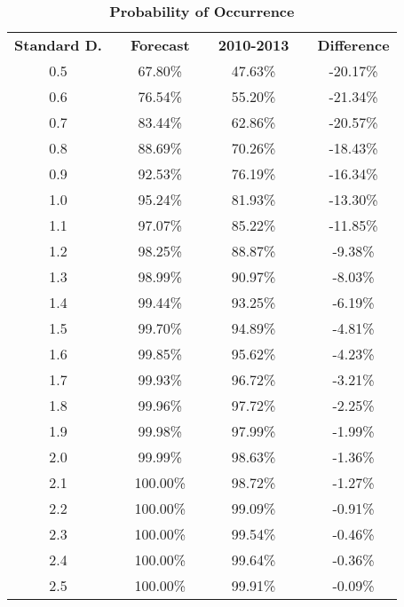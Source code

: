 \documentclass[12pt,halfline,a4paper]{ouparticle}
\begin{document}
\begin{table}[h]
	\centering
	\caption{\textbf{Probability of Occurrence}}
	\begin{tabular}{ccccccc}
		\toprule
		\toprule
		\textbf{Standard D.} &       & \textbf{Forecast} &       & \textbf{2010-2013} &       & \textbf{Difference} \\
		\cmidrule{1-1}\cmidrule{3-3}\cmidrule{5-5}\cmidrule{7-7}
		0.5   &       & 67.80\% &       & 47.63\% &       & -20.17\% \\
		0.6   &       & 76.54\% &       & 55.20\% &       & -21.34\% \\
		0.7   &       & 83.44\% &       & 62.86\% &       & -20.57\% \\
		0.8   &       & 88.69\% &       & 70.26\% &       & -18.43\% \\
		0.9   &       & 92.53\% &       & 76.19\% &       & -16.34\% \\
		1.0   &       & 95.24\% &       & 81.93\% &       & -13.30\% \\
		1.1   &       & 97.07\% &       & 85.22\% &       & -11.85\% \\
		1.2   &       & 98.25\% &       & 88.87\% &       & -9.38\% \\
		1.3   &       & 98.99\% &       & 90.97\% &       & -8.03\% \\
		1.4   &       & 99.44\% &       & 93.25\% &       & -6.19\% \\
		1.5   &       & 99.70\% &       & 94.89\% &       & -4.81\% \\
		1.6   &       & 99.85\% &       & 95.62\% &       & -4.23\% \\
		1.7   &       & 99.93\% &       & 96.72\% &       & -3.21\% \\
		1.8   &       & 99.96\% &       & 97.72\% &       & -2.25\% \\
		1.9   &       & 99.98\% &       & 97.99\% &       & -1.99\% \\
		2.0   &       & 99.99\% &       & 98.63\% &       & -1.36\% \\
		2.1   &       & 100.00\% &       & 98.72\% &       & -1.27\% \\
		2.2   &       & 100.00\% &       & 99.09\% &       & -0.91\% \\
		2.3   &       & 100.00\% &       & 99.54\% &       & -0.46\% \\
		2.4   &       & 100.00\% &       & 99.64\% &       & -0.36\% \\
		2.5   &       & 100.00\% &       & 99.91\% &       & -0.09\% \\

\end{tabular}
\end{table}
\end{document}
